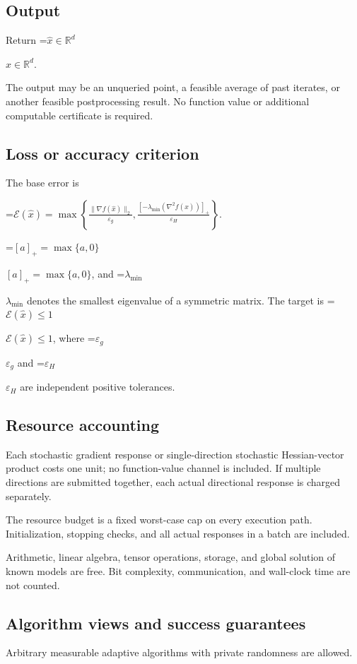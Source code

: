 \documentclass[10pt,a4paper]{article}
\newcommand{\AtlasMath}[1]{\par\begingroup\centering\setbox0=\hbox{$\displaystyle #1$}\ifdim\wd0>1.4\linewidth\typeout{ATLAS WIDE FORMULA: \the\wd0}\fi\ifdim\wd0>\linewidth\resizebox{\linewidth}{!}{\box0}\else\box0\fi\par\endgroup}
\newcommand{\AtlasInlineMath}[1]{\begingroup\setbox0=\hbox{$#1$}\ifdim\wd0>.4\linewidth\endgroup\AtlasMath{#1}\else\endgroup$#1$\fi}
\begin{document}
\subsection{Output}
Return \AtlasInlineMath{\widehat{x}\in \mathbb{R}^d}.

The output may be an unqueried point, a feasible average of past iterates, or another feasible postprocessing result. No function value or additional computable certificate is required.

\subsection{Loss or accuracy criterion}
The base error is


\AtlasMath{\mathcal{E}(\widehat{x})=\max\left\{\frac{\|\nabla f(\widehat{x})\|_2}{\varepsilon_g},\frac{[-\lambda_{\min}(\nabla^2f(\widehat{x}))]_+}{\varepsilon_H}\right\}.}


\AtlasInlineMath{[a]_+=\max\{a,0\}}, and \AtlasInlineMath{\lambda_{\min}} denotes the smallest eigenvalue of a symmetric matrix. The target is \AtlasInlineMath{\mathcal{E}(\widehat{x})\le1}, where \AtlasInlineMath{\varepsilon_g} and \AtlasInlineMath{\varepsilon_H} are independent positive tolerances.

\subsection{Resource accounting}
Each stochastic gradient response or single-direction stochastic Hessian-vector product costs one unit; no function-value channel is included. If multiple directions are submitted together, each actual directional response is charged separately.

The resource budget is a fixed worst-case cap on every execution path. Initialization, stopping checks, and all actual responses in a batch are included.

Arithmetic, linear algebra, tensor operations, storage, and global solution of known models are free. Bit complexity, communication, and wall-clock time are not counted.

\subsection{Algorithm views and success guarantees}
Arbitrary measurable adaptive algorithms with private randomness are allowed.
\end{document}
